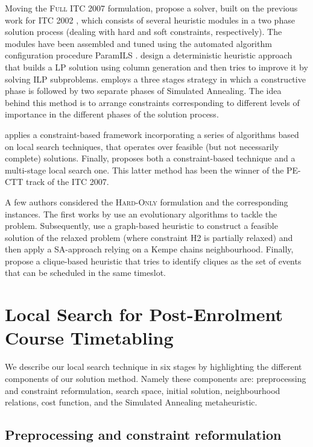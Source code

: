 \documentclass[authoryear,preprint,a4paper,12pt]{elsarticle}
\begin{document}
Moving the \textsc{Full} ITC 2007 formulation, \citet{ChFH08} propose
a solver, built on the previous work for ITC 2002 \citep{CBSR06},
which consists of several heuristic modules in a two phase solution
process (dealing with hard and soft constraints, respectively). The
modules have been assembled and tuned using the automated algorithm
configuration procedure ParamILS \citep{HHLS09}.  
design a deterministic heuristic approach that builds a LP solution
using column generation and then tries to improve it by solving ILP
subproblems.   employs a three stages strategy in which
a constructive phase is followed by two separate phases of Simulated
Annealing.  The idea behind this method is to arrange constraints
corresponding to different levels of importance in the different
phases of the solution process.

 applies a constraint-based framework incorporating a
series of algorithms based on local search techniques, that operates
over feasible (but not necessarily complete) solutions. Finally,
\citet{CHOP10} proposes both a constraint-based technique and a
multi-stage local search one. This latter method has been the winner
of the PE-CTT track of the ITC 2007.

A few authors considered the \textsc{Hard-Only} formulation and the
corresponding instances. The first works by \citet{LePa05, LePa07} use
an evolutionary algorithms to tackle the problem. Subsequently,
\citet{TuBM07} use a graph-based heuristic to construct a feasible
solution of the relaxed problem (where constraint H2 is partially
relaxed) and then apply a SA-approach relying on a Kempe chains
neighbourhood. Finally, \citet{LiZC11} propose a clique-based
heuristic that tries to identify cliques as the set of events that can
be scheduled in the same timeslot.


\section{Local Search for Post-Enrolment Course Timetabling}

We describe our local search technique in six stages by highlighting
the different components of our solution method. Namely these
components are: preprocessing and constraint reformulation,
search space, initial solution, neighbourhood relations, cost
function, and the Simulated Annealing metaheuristic.

\subsection{Preprocessing and constraint reformulation}
\end{document}

